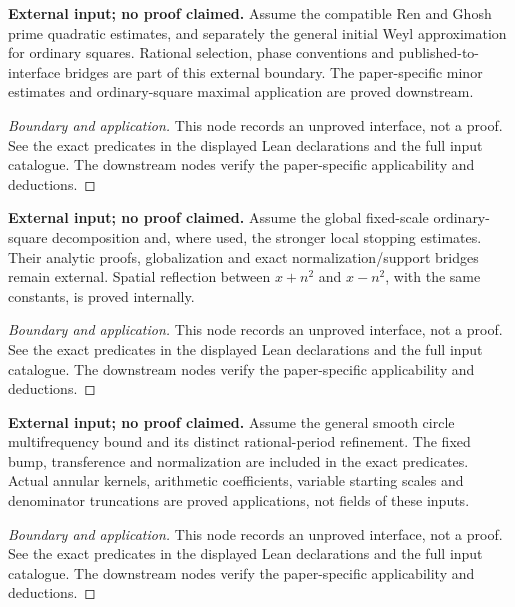 \begin{lemma}
\label{input_quadratic_sums}
\uses{}
\textbf{External input; no proof claimed.} Assume the compatible Ren and Ghosh prime quadratic estimates, and separately the general initial Weyl approximation for ordinary squares. Rational selection, phase conventions and published-to-interface bridges are part of this external boundary. The paper-specific minor estimates and ordinary-square maximal application are proved downstream.
\end{lemma}
\begin{proof}[Boundary and application]
\uses{}
This node records an unproved interface, not a proof. See the exact predicates in the displayed Lean declarations and the full input catalogue. The downstream nodes verify the paper-specific applicability and deductions.
\end{proof}

\begin{lemma}
\label{input_ordinary_squares}
\uses{}
\textbf{External input; no proof claimed.} Assume the global fixed-scale ordinary-square decomposition and, where used, the stronger local stopping estimates. Their analytic proofs, globalization and exact normalization/support bridges remain external. Spatial reflection between $x+n^2$ and $x-n^2$, with the same constants, is proved internally.
\end{lemma}
\begin{proof}[Boundary and application]
\uses{}
This node records an unproved interface, not a proof. See the exact predicates in the displayed Lean declarations and the full input catalogue. The downstream nodes verify the paper-specific applicability and deductions.
\end{proof}

\begin{lemma}
\label{input_multifrequency}
\uses{}
\textbf{External input; no proof claimed.} Assume the general smooth circle multifrequency bound and its distinct rational-period refinement. The fixed bump, transference and normalization are included in the exact predicates. Actual annular kernels, arithmetic coefficients, variable starting scales and denominator truncations are proved applications, not fields of these inputs.
\end{lemma}
\begin{proof}[Boundary and application]
\uses{}
This node records an unproved interface, not a proof. See the exact predicates in the displayed Lean declarations and the full input catalogue. The downstream nodes verify the paper-specific applicability and deductions.
\end{proof}

